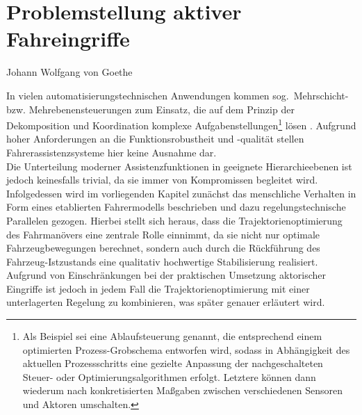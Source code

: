 \chapter{Problemstellung aktiver Fahreingriffe} \label{chap:grundlagen}

 {Johann Wolfgang von Goethe}




In vielen automatisierungstechnischen Anwendungen kommen sog.\ Mehrschicht- bzw. Mehrebenensteuerungen \cite{lunze2005regelungstechnik} zum Einsatz, die auf dem Prinzip der Dekomposition und Koordination komplexe Aufgabenstellungen\footnote{Als Beispiel sei eine Ablaufsteuerung genannt, die entsprechend einem optimierten Prozess-Grobschema entworfen wird, sodass in Abhängigkeit des aktuellen Prozessschritts eine gezielte Anpassung der nachgeschalteten Steuer- oder Optimierungsalgorithmen erfolgt. Letztere können dann wiederum nach konkretisierten Maßgaben zwischen verschiedenen Sensoren und Aktoren umschalten.%
}  lösen \cite{reinisch1974kybernetische}. Aufgrund hoher Anforderungen an die Funktionsrobustheit und -qualität stellen Fahrerassistenzsysteme hier keine Ausnahme dar. \\
Die Unterteilung moderner Assistenzfunktionen in geeignete Hierarchieebenen ist jedoch keinesfalls trivial, da sie immer von Kompromissen begleitet wird. Infolgedessen wird im vorliegenden Kapitel zunächst das menschliche Verhalten in Form eines etablierten Fahrermodells beschrieben und dazu regelungstechnische Parallelen gezogen. Hierbei stellt sich heraus, dass die Trajektorienoptimierung des Fahrmanövers eine zentrale Rolle einnimmt, da sie nicht nur optimale Fahrzeugbewegungen berechnet, sondern auch durch die Rückführung des Fahrzeug-Istzustands eine qualitativ hochwertige Stabilisierung realisiert. Aufgrund von Einschränkungen bei der praktischen Umsetzung aktorischer Eingriffe ist jedoch in jedem Fall die Trajektorienoptimierung mit einer unterlagerten Regelung zu kombinieren, was später genauer erläutert wird. \\
